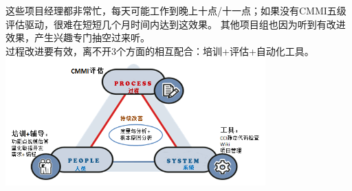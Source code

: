这些项目经理都非常忙，每天可能工作到晚上十点/十一点；如果没有CMMI五级评估驱动，很难在短短几个月时间内达到这效果。
其他项目组也因为听到有改进效果，产生兴趣专门抽空过来听。\\
过程改进要有效，离不开3个方面的相互配合：培训+评估+自动化工具。\\

\includegraphics[width=10cm]{3个关键点图1.png}




